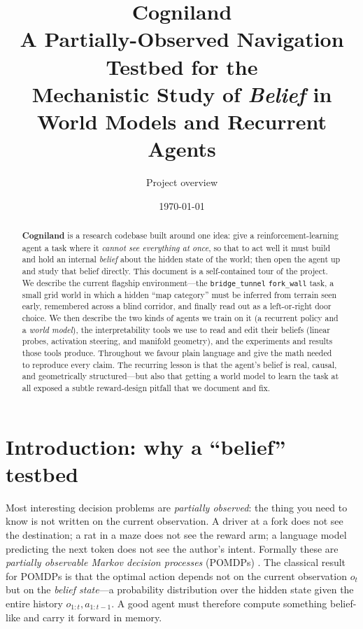 \documentclass[11pt]{article}
\title{\textbf{Cogniland}\\[3pt]
\large A Partially-Observed Navigation Testbed for the\\
Mechanistic Study of \emph{Belief} in World Models and Recurrent Agents}
\author{Project overview}
\date{\today}
\newcommand{\code}[1]{\texttt{\small #1}}
\begin{document}
\maketitle
\vspace{-2em}

\begin{abstract}\noindent
\textbf{Cogniland} is a research codebase built around one idea: give a
reinforcement-learning agent a task where it \emph{cannot see everything at
once}, so that to act well it must build and hold an internal \emph{belief}
about the hidden state of the world; then open the agent up and study that
belief directly. This document is a self-contained tour of the project. We
describe the current flagship environment---the \code{bridge\_tunnel}
\code{fork\_wall} task, a small grid world in which a hidden ``map category''
must be inferred from terrain seen early, remembered across a blind corridor,
and finally read out as a left-or-right door choice. We then describe the two
kinds of agents we train on it (a recurrent policy and a \emph{world model}),
the interpretability tools we use to read and edit their beliefs (linear
probes, activation steering, and manifold geometry), and the experiments and
results those tools produce. Throughout we favour plain language and give the
math needed to reproduce every claim. The recurring lesson is that the agent's
belief is real, causal, and geometrically structured---but also that getting a
world model to learn the task at all exposed a subtle reward-design pitfall
that we document and fix.
\end{abstract}

\tableofcontents
\vspace{1em}

\section{Introduction: why a ``belief'' testbed}
\label{sec:intro}

Most interesting decision problems are \emph{partially observed}: the thing you
need to know is not written on the current observation. A driver at a fork does
not see the destination; a rat in a maze does not see the reward arm; a language
model predicting the next token does not see the author's intent. Formally these
are \emph{partially observable Markov decision processes} (POMDPs)
\cite{kaelbling1998planning}. The classical result for POMDPs is that the
optimal action depends not on the current observation $o_t$ but on the
\emph{belief state}---a probability distribution over the hidden state given the
entire history $o_{1:t}, a_{1:t-1}$. A good agent must therefore compute
something belief-like and carry it forward in memory.
\end{document}
